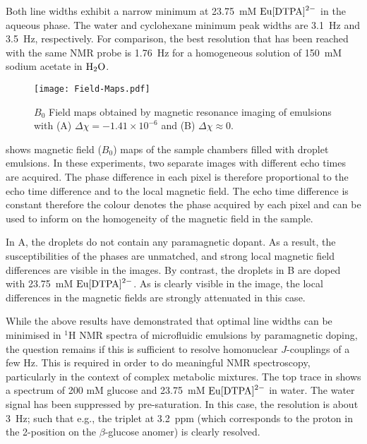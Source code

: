 Both line widths exhibit a narrow
minimum at 23.75~mM $\ce{Eu[DTPA]^{2-}}$ in the aqueous phase. The water and
cyclohexane minimum peak widths are 3.1~Hz and 3.5~Hz, respectively. For comparison, the best resolution
that has been reached with the same NMR probe is 1.76~Hz for a homogeneous
solution of 150~mM sodium acetate in $\ce{H_2O}$.\citep{Finch:2016gv}

\begin{figure}
  \begin{center}
    \texttt{[image: Field-Maps.pdf]}
  \end{center}
  \caption{$B_0$ Field maps obtained by magnetic resonance imaging of emulsions
  with (A) $\Delta\chi=-1.41\times 10^{-6}$ and (B) $\Delta\chi\approx 0$.
  }
  \label{fig:field-map}
\end{figure}

 shows magnetic field ($B_0$) maps of the sample chambers filled
with droplet emulsions.
In these experiments, two separate
images with different echo times are acquired. The phase difference in each pixel is therefore
proportional to the echo time difference and to the local magnetic field. The echo time difference is constant
therefore the colour denotes the phase acquired by each pixel and can be used to
inform on the homogeneity of the magnetic field in the sample.

In A, the droplets do not contain any paramagnetic dopant. As a result, the
susceptibilities of the phases are unmatched, and strong local magnetic field differences
are visible in the images. By contrast, the droplets in B are doped with 23.75~mM
$\ce{Eu[DTPA]^{2-}}$. As is clearly visible in the image, the local differences in the magnetic
fields are strongly attenuated in this case.

While the above results have demonstrated that optimal line widths can be minimised in $^1$H NMR
spectra of microfluidic emulsions by paramagnetic doping,
the question remains if this is sufficient to resolve homonuclear
$J$-couplings of a few Hz. This is required in order to do meaningful NMR spectroscopy,
particularly in the context of complex metabolic mixtures.
The top trace in  shows a spectrum of 200 mM glucose
and 23.75~mM $\ce{Eu[DTPA]^{2-}}$ in water. The water signal has been suppressed by pre-saturation.
In this case, the resolution is about 3~Hz; such that e.g., the triplet at 3.2~ppm (which corresponds
to the proton in the 2-position on the $\beta$-glucose anomer) is clearly resolved.

